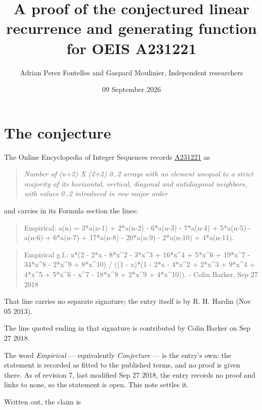 \documentclass[11pt]{article}
\title{A proof of the conjectured linear recurrence and generating function for OEIS A231221}
\author{Adrian Perez Fontelles and Gaspard Moulinier, Independent researchers}
\date{09 September 2026}
\theoremstyle{definition}
\begin{document}
\maketitle
\section{The conjecture}

The Online Encyclopedia of Integer Sequences records \href{https://oeis.org/A231221}{A231221} as

\begin{quote}\itshape Number of (n+2) X (2+2) 0..2 arrays with no element unequal to a strict majority of its horizontal, vertical, diagonal and antidiagonal neighbors, with values 0..2 introduced in row major order\end{quote}

and carries in its Formula section the lines:

\begin{quote}\ttfamily Empirical: a(n) = 3*a(n-1) + 2*a(n-2) - 6*a(n-3) - 7*a(n-4) + 5*a(n-5) - a(n-6) + 6*a(n-7) + 17*a(n-8) - 20*a(n-9) - 2*a(n-10) + 4*a(n-11).\end{quote}

\begin{quote}\ttfamily Empirical g.f.: x*(2 - 2*x - 8*x\textasciicircum{}2 - 3*x\textasciicircum{}3 + 16*x\textasciicircum{}4 + 5*x\textasciicircum{}6 + 19*x\textasciicircum{}7 - 34*x\textasciicircum{}8 - 2*x\textasciicircum{}9 + 8*x\textasciicircum{}10) / ((1 - x)*(1 - 2*x - 4*x\textasciicircum{}2 + 2*x\textasciicircum{}3 + 9*x\textasciicircum{}4 + 4*x\textasciicircum{}5 + 5*x\textasciicircum{}6 - x\textasciicircum{}7 - 18*x\textasciicircum{}8 + 2*x\textasciicircum{}9 + 4*x\textasciicircum{}10)). - Colin Barker, Sep 27 2018\end{quote}

That line carries no separate signature; the entry itself is by R. H. Hardin (Nov 05 2013).

The line quoted ending in that signature is contributed by Colin Barker on Sep 27 2018.

The word {\itshape Empirical} --- equivalently {\itshape Conjecture} --- is the entry's own: the statement is recorded as fitted to the published terms, and no proof is given there. As of revision 7, last modified Sep 27 2018, the entry records no proof and links to none, so the statement is open. This note settles it.

Written out, the claim is
\end{document}

